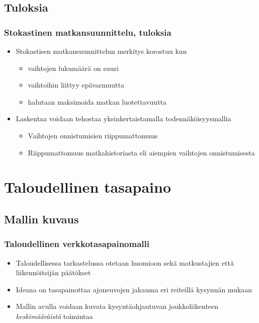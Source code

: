 \documentclass{beamer}
\begin{document}
    \subsection{Tuloksia}
        \begin{frame}
  \frametitle{Stokastinen matkansuunnittelu, tuloksia} 
  \begin{itemize}
   \item 
Stokastisen matkansuunnittelun merkitys korostuu kun 
\begin{itemize}
 \item 
vaihtojen lukumäärä on suuri 
\item
vaihtoihin liittyy epävarmuutta
\item
halutaan maksimoida matkan luotettavuutta
\end{itemize}
\item
Laskentaa voidaan tehostaa yksinkertaistamalla todennäköisyysmallia
\begin{itemize}
 \item 
Vaihtojen onnistumisien riippumattomuus
\item
Riippumattomuus matkahistoriasta eli aiempien vaihtojen onnistumisesta
\end{itemize}
\end{itemize}
    \end{frame}     
    
    
\section{Taloudellinen tasapaino}
\subsection{Mallin kuvaus}
\begin{frame}
  \frametitle{Taloudellinen verkkotasapainomalli} 
  \begin{itemize}
   \item 
   Taloudellisessa tarkastelussa otetaan huomioon sekä matkustajien että liikennöitsijän päätökset
   \item
   Ideana on tasapainottaa ajoneuvojen jakauma eri reiteillä kysynnän mukaan
   \item
   Mallin avulla voidaan kuvata kysyntäohjautuvan joukkoliikenteen \emph{keskimääräistä} toimintaa
   \end{itemize}
    \end{frame}   
    
\end{document}
